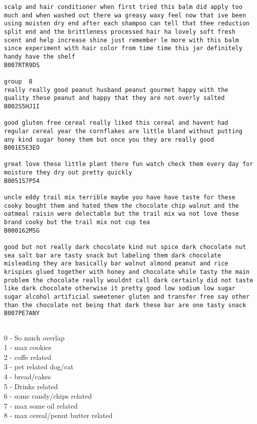 \documentclass[11pt]{article}
\begin{document}
\begin{Verbatim}[commandchars=\\\{\}]
scalp and hair conditioner when first tried this balm did apply too much and when washed out there wa greasy waxy feel now that ive been using moisten dry end after each shampoo can tell that thee reduction split end and the brittleness processed hair ha lovely soft fresh scent and help increase shine just remember le more with this balm since experiment with hair color from time time this jar definitely handy have the shelf
B007RTR9DS

group  8
really really good peanut husband peanut gourmet happy with the quality these peanut and happy that they are not overly salted
B002S5HJ1I

good gluten free cereal really liked this cereal and havent had regular cereal year the cornflakes are little bland without putting any kind sugar honey them but once you they are really good
B001E5E3EO

great love these little plant there fun watch check them every day for moisture they dry out pretty quickly
B0051S7P54

uncle eddy trail mix terrible maybe you have have taste for these cooky bought them and hated them the chocolate chip walnut and the oatmeal raisin were delectable but the trail mix wa not love these brand cooky but the trail mix not cup tea
B000162MSG

good but not really dark chocolate kind nut spice dark chocolate nut sea salt bar are tasty snack but labeling them dark chocolate misleading they are basically bar walnut almond peanut and rice krispies glued together with honey and chocolate while tasty the main problem the chocolate really wouldnt call dark certainly did not taste like dark chocolate otherwise it pretty good low sodium low sugar sugar alcohol artificial sweetener gluten and transfer free say other than the chocolate not being that dark these bar are one tasty snack
B007PE7ANY


    \end{Verbatim}

    0 - So much overlap\\
1 - max cookies\\
2 - coffe related\\
3 - pet related dog/cat\\
4 - bread/cakes\\
5 - Drinks related\\
6 - some candy/chips related\\
7 - max some oil related\\
8 - max cereal/penut butter related
\end{document}
